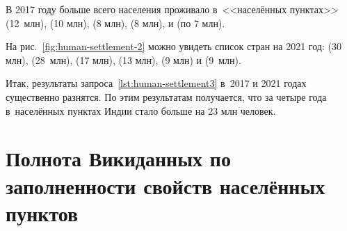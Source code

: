 

В 2017 году больше всего населения проживало в~<<населённых пунктах>> 
 (12~млн), 
 (\num{10} млн), 
 (\num{8} млн), 
 (\num{8} млн), 
 и 
 (по \num{7} млн). 

На рис.~\ref{fig:human-settlement-2} можно увидеть список стран на 2021 год: 
 (\num{30} млн), 
 (28~млн), 
 (\num{17} млн), 
 (\num{13} млн), 
 (\num{9} млн) и 
 (\num{9}~млн). 

Итак, результаты запроса~\ref{lst:human-settlement3} в~2017 и 2021 годах существенно разнятся. 
По этим результатам получается, что за четыре года 
в~населённых пунктах Индии стало больше на 23 млн человек. 


\section[Полнота Викиданных по заполненности свойств населённых пунктов]
        {Полнота Викиданных по заполненности свойств населённых пунктов}

